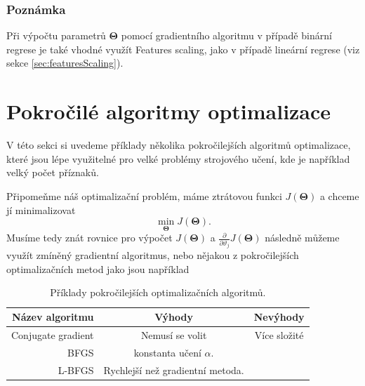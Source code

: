 \subsubsection*{Poznámka}
\par{Při výpočtu parametrů $\bm{\Theta}$ pomocí gradientního algoritmu v případě binární regrese je také vhodné využít Features scaling, jako v případě lineární regrese (viz sekce \ref{sec:featuresScaling}).}



\newpage



















\section{Pokročilé algoritmy optimalizace}

\par{V této sekci si uvedeme příklady několika pokročilejších algoritmů optimalizace, které jsou lépe využitelné pro velké problémy strojového učení, kde je například velký počet příznaků.}

\par{Připomeňme náš optimalizační problém, máme ztrátovou funkci $J \left( \bm{\Theta} \right)$ a chceme jí minimalizovat
\begin{equation}
	\min_{\bm{\Theta}} J \left( \bm{\Theta} \right).
\end{equation}
Musíme tedy znát rovnice pro výpočet $J \left( \bm{\Theta} \right)$ a $\frac{\partial}{\partial \vartheta_j} J \left( \bm{\Theta} \right)$ následně můžeme využít zmíněný gradientní algoritmus, nebo nějakou z pokročilejších optimalizačních metod jako jsou například
\begin{table}[!ht]
\begin{center}
\begin{tabular}{r|c|c}
	{Název algoritmu} & {Výhody} & {Nevýhody}\\
	\hline
	{Conjugate gradient} & {Nemusí se volit} & {Více složité}\\
	{BFGS} & {konstanta učení $\alpha$.} & {}\\
	{L-BFGS} & {Rychlejší než gradientní metoda.} & {}
\end{tabular}
	\caption{Příklady pokročilejších optimalizačních algoritmů.}
\end{center}
\end{table}}

